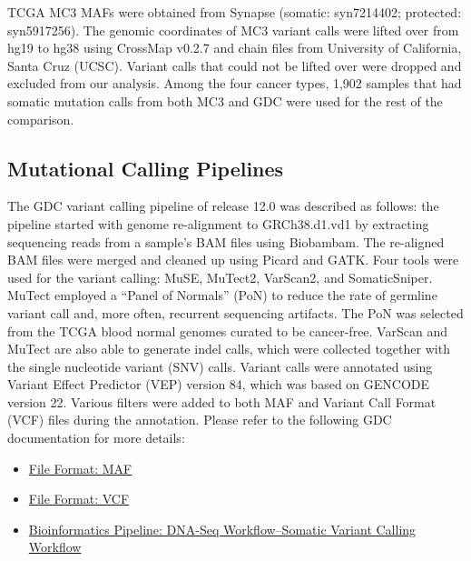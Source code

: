 TCGA MC3 MAFs were obtained from Synapse (somatic: syn7214402; protected: syn5917256). The genomic coordinates of MC3 variant calls were lifted over from hg19 to hg38 using CrossMap v0.2.7 and chain files from University of California, Santa Cruz (UCSC). Variant calls that could not be lifted over were dropped and excluded from our analysis. Among the four cancer types, 1,902 samples that had somatic mutation calls from both MC3 and GDC were used for the rest of the comparison.

\subsection{Mutational Calling Pipelines}
The GDC variant calling pipeline of release 12.0 was described as follows: the pipeline started with genome re-alignment to GRCh38.d1.vd1 by extracting sequencing reads from a sample's BAM files using Biobambam. The re-aligned BAM files were merged and cleaned up using Picard and GATK. Four tools were used for the variant calling: MuSE, MuTect2, VarScan2, and SomaticSniper. MuTect employed a ``Panel of Normals'' (PoN) to reduce the rate of germline variant call and, more often, recurrent sequencing artifacts. The PoN was selected from the TCGA blood normal genomes curated to be cancer-free. VarScan and MuTect are also able to generate indel calls, which were collected together with the single nucleotide variant (SNV) calls. Variant calls were annotated using Variant Effect Predictor (VEP) version 84, which was based on GENCODE version 22. Various filters were added to both MAF and Variant Call Format (VCF) files during the annotation. Please refer to the following GDC documentation for more details:

\tightlists
\begin{itemize}
    \tightlist
    \item \href{https://docs.gdc.cancer.gov/Data/File_Formats/MAF_Format/}{File Format: MAF}
    \item \href{https://docs.gdc.cancer.gov/Data/File_Formats/VCF_Format/}{File Format: VCF}
    \item \href{https://docs.gdc.cancer.gov/Data/Bioinformatics_Pipelines/DNA_Seq_Variant_Calling_Pipeline/#somatic-variant-calling-workflow}{Bioinformatics Pipeline: DNA-Seq Workflow--Somatic Variant Calling Workflow}
\end{itemize}

